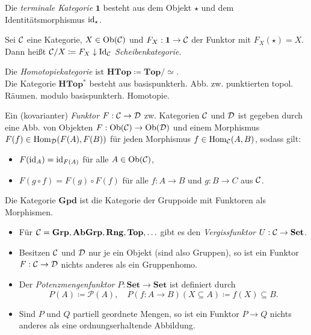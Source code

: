 \documentclass{cheat-sheet}
\newcommand{\Pow}{\mathcal{P}} %
\begin{document}
\begin{defn}
  Die \emph{terminale Kategorie} $\mathbf{1}$ besteht aus dem Objekt $\star$ und dem Identitätsmorphismus $\operatorname{id}_\star$.
\end{defn}

\begin{defn}
  Sei $\mathcal{C}$ eine Kategorie, $X \in \operatorname{Ob}(\mathcal{C})$ und $F_X : \mathbf{1} \to \mathcal{C}$ der Funktor mit $F_X(\star) = X$. Dann heißt $\mathcal{C}/X \coloneqq F_X \downarrow \operatorname{Id}_{\mathcal{C}}$ \emph{Scheibenkategorie}.
\end{defn}

\begin{defn}
  Die \emph{Homotopiekategorie} ist $\mathbf{HTop} \coloneqq \mathbf{Top} / {\simeq}$. \\
  Die Kategorie $\mathbf{HTop^*}$ besteht aus basispunkterh. Abb. zw. punktierten topol. Räumen. modulo basispunkterh. Homotopie.
\end{defn}


\begin{defn}
  Ein (kovarianter) \emph{Funktor} $F : \mathcal{C} \to \mathcal{D}$ zw. Kategorien $\mathcal{C}$ und $\mathcal{D}$ ist gegeben durch eine Abb. von Objekten $F : \operatorname{Ob}(\mathcal{C}) \to \operatorname{Ob}(\mathcal{D})$ und einem Morphismus $F(f) \in \operatorname{Hom}_{\mathcal{D}}(F(A), F(B))$ für jeden Morphismus $f \in \operatorname{Hom}_{\mathcal{C}}(A, B)$, sodass gilt:
  \begin{itemize}
    \item $F(\operatorname{id}_A) = \operatorname{id}_{F(A)}$ für alle $A \in \operatorname{Ob}(\mathcal{C})$,
    \item $F(g \circ f) = F(g) \circ F(f)$ für alle $f : A \to B$ und $g : B \to C$ aus $\mathcal{C}$.
  \end{itemize}
\end{defn}

\begin{defn}
  Die Kategorie $\mathbf{Gpd}$ ist die Kategorie der Gruppoide mit Funktoren als Morphismen.
\end{defn}

\begin{bspe}
  \begin{itemize}
    \item Für $\mathcal{C} = \mathbf{Grp}, \mathbf{AbGrp}, \mathbf{Rng}, \mathbf{Top}, \ldots$ gibt es den \emph{Vergissfunktor} $U : \mathcal{C} \to \mathbf{Set}$.
    \item Besitzen $\mathcal{C}$ und $\mathcal{D}$ nur je ein Objekt (sind also Gruppen), so ist ein Funktor $F : \mathcal{C} \to \mathcal{D}$ nichts anderes als ein Gruppenhomo.
    \item Der \emph{Potenzmengenfunktor} $P : \mathbf{Set} \to \mathbf{Set}$ ist definiert durch
    \[ P(A) \coloneqq \Pow(A), \quad P(f : A \to B)(X \subseteq A) \coloneqq f(X) \subseteq B. \]
    \item Sind $P$ und $Q$ partiell geordnete Mengen, so ist ein Funktor $P \to Q$ nichts anderes als eine ordnungserhaltende Abbildung.
  \end{itemize}
\end{bspe}
\end{document}
